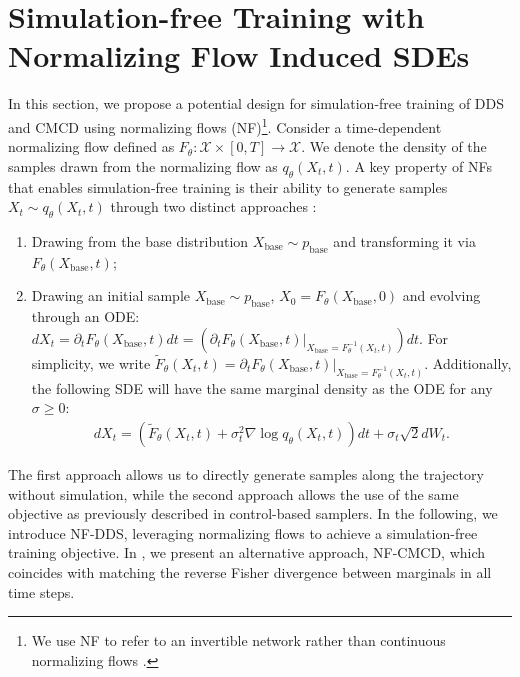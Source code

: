 \section{Simulation-free Training with Normalizing Flow Induced SDEs}\label{sec:sim_free}\vspace{-4pt}
In this section, we propose a potential design for simulation-free training of DDS and CMCD using normalizing flows (NF)\footnote{We use NF to refer to an invertible network rather than continuous normalizing flows \citep{chen2018neural}.}.
Consider a time-dependent normalizing flow defined as $F_\theta: \mathcal{X} \times [0, T] \rightarrow \mathcal{X}.$
We denote the density of the samples drawn from the normalizing flow as $q_\theta(X_t, t)$.
A key property of NFs that enables simulation-free training is their ability to generate samples $X_t \sim q_\theta(X_t, t)$ through two distinct approaches \citep{bartosh2024neural}:
\begin{enumerate}[leftmargin=*]
    \item Drawing from the base distribution \( X_\text{base} \sim p_\text{base} \) and transforming it via \( F_\theta(X_\text{base}, t) \);
    \item Drawing an initial sample \( X_\text{base} \sim p_\text{base} \), $X_0 = F_\theta(X_\text{base}, 0)$ and evolving through an ODE:
   $
        dX_t = \partial_t F_\theta(X_\text{base}, t) dt = (\partial_t F_\theta(X_\text{base}, t)|_{X_\text{base} = F_\theta^{-1}(X_t, t)} )dt
 $. 
    For simplicity, we write $\tilde{F}_\theta(X_t, t) = \partial_t F_\theta(X_\text{base}, t)|_{X_\text{base} = F_\theta^{-1}(X_t, t)}$.
    Additionally, the following SDE will have the same marginal density as the ODE for any $\sigma\geq 0$:
    \begin{align}\label{eq:nf-sde}
        dX_t = \left(\tilde{F}_\theta(X_t, t) + \sigma_t^2 \nabla\log q_\theta(X_t, t) \right)dt + \sigma_t\sqrt{2} dW_t.
    \end{align}   
\end{enumerate}
The first approach allows us to directly generate samples along the trajectory without simulation, while the second approach allows the use of the same objective as previously described in control-based samplers.
In the following, we introduce NF-DDS, leveraging normalizing flows to achieve a simulation-free training objective.
In , we present an alternative approach, NF-CMCD, which coincides with matching the reverse Fisher divergence between marginals in all time steps.
\par

